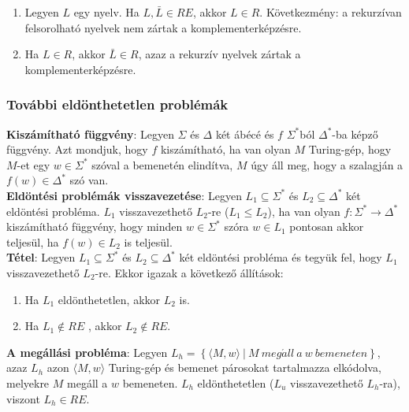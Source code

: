 \documentclass[margin=0px]{article}
\begin{document}
	\begin{enumerate}
		\item	Legyen $L$ egy nyelv. Ha $L, \bar{L} \in RE$, akkor $L \in R$. Következmény: a rekurzívan felsorolható
		nyelvek nem zártak a komplementerképzésre.
		
		\item	Ha $L \in R$, akkor $\bar{L} \in R$, azaz a rekurzív nyelvek zártak a komplementerképzésre.
	\end{enumerate}
	
	\subsubsection{További eldönthetetlen problémák}
	
	\noindent \textbf{Kiszámítható függvény}: Legyen $\Sigma$ és $\Delta$ két ábécé és $f$ $\Sigma^{*}$ból
	$\Delta^{*}$-ba képző függvény. Azt mondjuk, hogy $f$ kiszámítható, ha van olyan $M$ Turing-gép, hogy
	$M$-et egy $w \in \Sigma^{*}$ szóval a bemenetén elindítva, $M$ úgy áll meg, hogy a szalagján a
	$f(w) \in \Delta^{*}$ szó van.\\
	
	\noindent \textbf{Eldöntési problémák visszavezetése}: Legyen $L_{1} \subseteq \Sigma^{*}$ és $L_{2} \subseteq \Delta^{*}$
	két eldöntési probléma. $L_{1}$ visszavezethető $L_{2}$-re ($L_{1} \leq L_{2}$), ha van olyan
	$f : \Sigma^{*} \to \Delta^{*}$ kiszámítható függvény, hogy minden $w \in \Sigma^{*}$ szóra
	$w \in L_{1}$ pontosan akkor teljesül, ha $f(w) \in L_{2}$ is teljesül.\\
	
	\noindent \textbf{Tétel}: Legyen $L_{1} \subseteq \Sigma^{*}$ és $L_{2} \subseteq \Delta^{*}$
	két eldöntési probléma és tegyük fel, hogy $L_{1}$ visszavezethető $L_{2}$-re. Ekkor igazak a következő állítások:
	
	\begin{enumerate}
		\item	Ha $L_{1}$ eldönthetetlen, akkor $L_{2}$ is.
		
		\item	Ha $L_{1} \notin RE$ , akkor $L_{2} \notin RE$.
	\end{enumerate}
	
	\noindent \textbf{A megállási probléma}: Legyen $L_{h} = \left\{\langle M, w \rangle \ |\ M \ meg\acute{a}ll \ a \ w \ bemeneten \right\}$,
	azaz $L_{h}$ azon $\langle M, w \rangle$ Turing-gép és bemenet párosokat tartalmazza elkódolva, melyekre $M$ megáll a $w$ bemeneten.
	$L_{h}$ eldönthetetlen ($L_{u}$ visszavezethető $L_{h}$-ra), viszont $L_{h} \in RE$.\\
	
\end{document}
